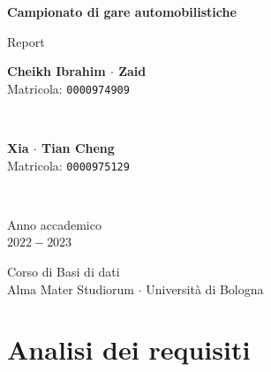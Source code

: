 \documentclass[11pt]{article}
\begin{document}
\begin{titlepage}
    \begin{center}
        \vspace*{1.5cm}
            
        \Huge
        \textbf{Campionato di gare automobilistiche}
            
        \vspace{0.3cm}
        \LARGE
        Report\\[0.2em]

        \vspace{1.5cm}
          
        \begin{minipage}[t]{0.47\textwidth}
            \begin{center}
                \parbox{50mm}{\centering\large {\bf Cheikh Ibrahim $\cdot$ Zaid} \\[0.3em] Matricola: \texttt{0000974909}}\\[2em]
            \end{center}
		\end{minipage}
		\hfill
		\begin{minipage}[t]{0.47\textwidth}\raggedleft
            \begin{center}
                \parbox{50mm}{\centering\large {\bf Xia $\cdot$ Tian Cheng} \\[0.3em] Matricola: \texttt{0000975129}}\\[2em]
            \end{center}
		\end{minipage}  
            
        \vspace{9cm}
            
        Anno accademico\\
        $2022 - 2023$
            
        \vspace{0.8cm}
            
            
        \Large
        Corso di Basi di dati\\
        Alma Mater Studiorum $\cdot$ Università di Bologna\\
            
    \end{center}
\end{titlepage}
\pagebreak


\tableofcontents
\newpage


\section{Analisi dei requisiti}
\end{document}
